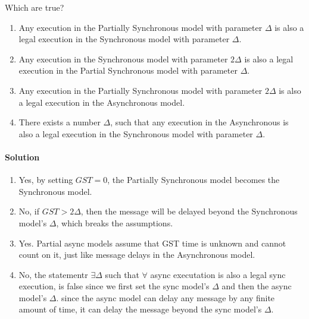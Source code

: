\begin{xca}
    Which are true?
    \begin{enumerate}
        \item Any execution in the Partially Synchronous model with parameter
         $\Delta$ is also a legal execution in the Synchronous model with parameter $\Delta$.

        \item Any execution in the Synchronous model with parameter 
        $2 \Delta$ is also a legal execution in the Partial Synchronous model with parameter $\Delta$.

        \item Any execution in the Partially Synchronous model with parameter 
        $2\Delta$ is also a legal execution in the Asynchronous model.

        \item There exists a number $\Delta$, such that any execution in the Asynchronous 
        is also a legal execution in the Synchronous model with parameter $\Delta$.
    \end{enumerate}
    
    \paragraph{Solution}
    \begin{enumerate}
        \item Yes, by setting $GST=0$, the Partially Synchronous model becomes the Synchronous model.

        \item No, if $GST > 2\Delta$, then the message will be
        delayed beyond the Synchronous model's $\Delta$, which breaks the assumptions.

        \item Yes. Partial async models assume that GST time is unknown and cannot count on it, just like 
        message delays in the Asynchronous model.

        \item No, the statementr $\exists \Delta$ such that $\forall$ async executation is also a legal sync execution,
        is false since we first set the sync model's $\Delta$ and then the async model's $\Delta$.
        since the async model can delay any message by any finite amount of time, it can delay the message beyond the sync model's $\Delta$.

    \end{enumerate}
\end{xca}



